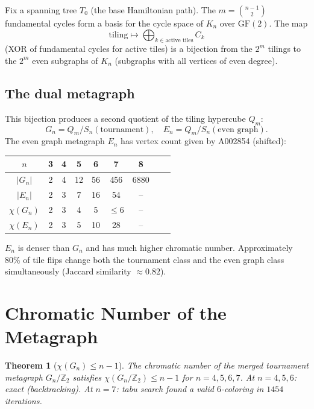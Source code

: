 \documentclass[11pt,a4paper]{article}
\newtheorem{theorem}{Theorem}[section]
\theoremstyle{definition}
\theoremstyle{remark}
\begin{document}
Fix a spanning tree $T_0$ (the base Hamiltonian path). The $m = \binom{n-1}{2}$ fundamental cycles form a basis for the cycle space of $K_n$ over $\mathrm{GF}(2)$. The map
\[
\text{tiling} \mapsto \bigoplus_{k \in \text{active tiles}} C_k
\]
(XOR of fundamental cycles for active tiles) is a bijection from the $2^m$ tilings to the $2^m$ even subgraphs of $K_n$ (subgraphs with all vertices of even degree).

\subsection{The dual metagraph}

This bijection produces a second quotient of the tiling hypercube $Q_m$:
\[
G_n = Q_m / S_n(\text{tournament}), \quad E_n = Q_m / S_n(\text{even graph}).
\]
The even graph metagraph $E_n$ has vertex count given by A002854 (shifted):

\begin{center}
\begin{tabular}{c c c c c c c c c}
\toprule
$n$ & 3 & 4 & 5 & 6 & 7 & 8 \\
\midrule
$|G_n|$ & 2 & 4 & 12 & 56 & 456 & 6880 \\
$|E_n|$ & 2 & 3 & 7 & 16 & 54 & -- \\
$\chi(G_n)$ & 2 & 3 & 4 & 5 & $\leq 6$ & -- \\
$\chi(E_n)$ & 2 & 3 & 5 & 10 & 28 & -- \\
\bottomrule
\end{tabular}
\end{center}

\noindent $E_n$ is denser than $G_n$ and has much higher chromatic number. Approximately 80\% of tile flips change both the tournament class and the even graph class simultaneously (Jaccard similarity $\approx 0.82$).

\section{Chromatic Number of the Metagraph}
\label{sec:chromatic}

\begin{theorem}[$\chi(G_n) \leq n-1$]
\label{thm:chromatic}
The chromatic number of the merged tournament metagraph $G_n/\mathbb{Z}_2$ satisfies $\chi(G_n/\mathbb{Z}_2) \leq n-1$ for $n = 4, 5, 6, 7$. At $n = 4, 5, 6$: exact (backtracking). At $n = 7$: tabu search found a valid $6$-coloring in $1454$ iterations.
\end{theorem}
\end{document}

